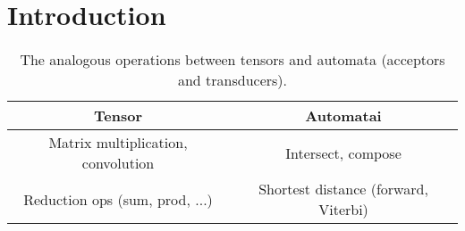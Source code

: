 \documentclass[main.tex]{subfiles}
\begin{document}
\section{Introduction}
\label{sec:introduction}

\begin{table}[ht]
    \caption{The analogous operations between tensors and
    automata (acceptors and transducers).}
    \centering
    \begin{tabular}{c c}
    \toprule
        Tensor & Automatai \\
    \midrule
        Matrix multiplication, convolution & Intersect, compose \\
        Reduction ops (sum, prod, ...) & Shortest distance (forward, Viterbi) \\
    \bottomrule
    \end{tabular}
    \label{tab:tensor_wfst_analogy}
\end{table}
\end{document}
